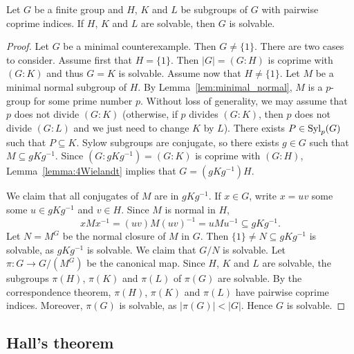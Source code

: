 \begin{theorem}[Wielandt]
	\label{theorem:Wielandt:solvable}
	Let $G$ be a finite group and $H$, $K$ and $L$ be 
        subgroups of $G$ with pairwise coprime indices. 
        If $H$, $K$ and $L$ are solvable, then $G$ is 
	solvable.
\end{theorem}

\begin{proof}
    Let $G$ be a minimal counterexample. Then $G\ne\{1\}$. 
    There are two cases to consider. 
    Assume first that $H=\{1\}$. Then 
    $|G|=(G:H)$ is coprime with $(G:K)$ and thus $G=K$ is solvable. 
    Assume now that  
    $H\ne \{1\}$. Let $M$ be a minimal normal subgroup of $H$. By Lemma~\ref{lem:minimal_normal}, 
    $M$ is a $p$-group for some prime number $p$. 
    Without loss of generality, we may assume that $p$ does not divide $(G:K)$ (otherwise, if $p$ divides $(G:K)$, then 
    $p$ does not divide $(G:L)$ and we just need to change $K$ by $L$). 
    There exists $P\in\mathrm{Syl}_p(G)$ such that $P\subseteq K$. Sylow subgroups are conjugate, so there exists 
    $g\in G$ such that $M\subseteq
	gKg^{-1}$. Since $(G:gKg^{-1})=(G:K)$ is coprime with $(G:H)$, Lemma~\ref{lemma:4Wielandt} implies that
    $G=(gKg^{-1})H$. 
	
    We claim that all conjugates of $M$ are in $gKg^{-1}$. 
    If $x\in G$, write $x=uv$ some some $u\in 
	gKg^{-1}$ and $v\in H$. Since $M$ is normal in $H$, 
	\[
	xMx^{-1}=(uv)M(uv)^{-1}=uMu^{-1}\subseteq gKg^{-1}.
	\]
        Let $N=M^G$ be the normal closure of $M$ in $G$. 
	Then $\{1\}\ne N\subseteq gKg^{-1}$ is solvable, as $gKg^{-1}$ is 
	solvable. We claim that $G/N$ is solvable. Let 
         $\pi\colon G\to G/(M^G)$ be the canonical map. Since $H$, $K$ and $L$ are solvable, 
    the subgroups $\pi(H)$, $\pi(K)$ and $\pi(L)$ of $\pi(G)$ are solvable. By the correspondence theorem, $\pi(H)$, $\pi(K)$ and $\pi(L)$ have pairwise coprime indices. Moreover, $\pi(G)$ is solvable, as
    $|\pi(G)|<|G|$.  
        Hence 
        $G$ is solvable. 
\end{proof}

\subsection{Hall's theorem}

